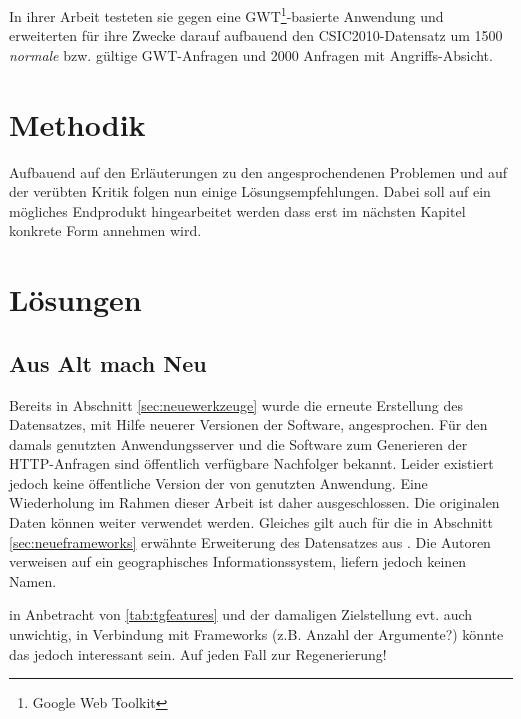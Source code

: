 In ihrer Arbeit testeten sie gegen eine GWT\footnote{Google Web Toolkit}-basierte Anwendung und erweiterten für ihre Zwecke darauf aufbauend den CSIC2010-Datensatz um 1500 \emph{normale} bzw. gültige GWT-Anfragen und 2000 Anfragen mit Angriffs-Absicht.



\section{Methodik}
Aufbauend auf den Erläuterungen zu den angesprochendenen Problemen und auf der verübten Kritik folgen nun einige Lösungsempfehlungen. Dabei soll auf ein mögliches Endprodukt hingearbeitet werden dass erst im nächsten Kapitel konkrete Form annehmen wird. 

\section{Lösungen}

\subsection{Aus Alt mach Neu}
\label{sec:lsgalt}
Bereits in Abschnitt \ref{sec:neuewerkzeuge} wurde die erneute Erstellung des Datensatzes, mit Hilfe neuerer Versionen der Software, angesprochen. Für den damals genutzten Anwendungsserver und die Software zum Generieren der HTTP-Anfragen sind öffentlich verfügbare Nachfolger bekannt. Leider existiert jedoch keine öffentliche Version der von \cite{Giménez2015} genutzten Anwendung. Eine Wiederholung im Rahmen dieser Arbeit ist daher ausgeschlossen. Die originalen Daten können weiter verwendet werden. Gleiches gilt auch für die in Abschnitt \ref{sec:neueframeworks} erwähnte Erweiterung des Datensatzes aus \cite{kozik2019}. Die Autoren verweisen auf ein geographisches Informationssystem, liefern jedoch keinen Namen.\\

\begin{neu}
  in Anbetracht von \ref{tab:tgfeatures} und der damaligen Zielstellung evt. auch unwichtig, in Verbindung mit Frameworks (z.B. Anzahl der Argumente?) könnte das jedoch interessant sein. Auf jeden Fall zur Regenerierung!
\end{neu}

